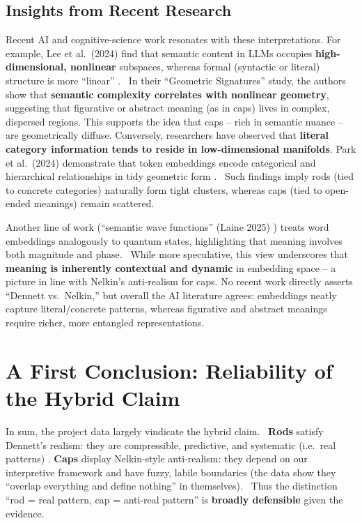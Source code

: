 \documentclass[12pt]{article}
\begin{document}
\subsection{Insights from Recent Research}\label{insights-from-recent-research}

Recent AI and cognitive-science work resonates with these interpretations. For example, Lee et al.~(2024) find that semantic content in LLMs occupies \textbf{high-dimensional, nonlinear} subspaces, whereas formal (syntactic or literal) structure is more ``linear'' .~ In their ``Geometric Signatures'' study, the authors show that \textbf{semantic complexity correlates with nonlinear geometry}, suggesting that figurative or abstract meaning (as in caps) lives in complex, dispersed regions. This supports the idea that caps -- rich in semantic nuance -- are geometrically diffuse. Conversely, researchers have observed that \textbf{literal category information tends to reside in low-dimensional manifolds}. Park et al.~(2024) demonstrate that token embeddings encode categorical and hierarchical relationships in tidy geometric form .~ Such findings imply rods (tied to concrete categories) naturally form tight clusters, whereas caps (tied to open-ended meanings) remain scattered.

Another line of work (``semantic wave functions'' (Laine 2025) ) treats word embeddings analogously to quantum states, highlighting that meaning involves both magnitude and phase.~ While more speculative, this view underscores that \textbf{meaning is inherently contextual and dynamic} in embedding space -- a picture in line with Nelkin's anti-realism for caps. No recent work directly asserts ``Dennett vs.~Nelkin,'' but overall the AI literature agrees: embeddings neatly capture literal/concrete patterns, whereas figurative and abstract meanings require richer, more entangled representations.

\section{A First Conclusion: Reliability of the Hybrid Claim}\label{a-first-conclusion-reliability-of-the-hybrid-claim}

In sum, the project data largely vindicate the hybrid claim.~ \textbf{Rods} satisfy Dennett's realism: they are compressible, predictive, and systematic (i.e.~real patterns) . \textbf{Caps} display Nelkin-style anti-realism: they depend on our interpretive framework and have fuzzy, labile boundaries (the data show they ``overlap everything and define nothing'' in themselves).~ Thus the distinction ``rod = real pattern, cap = anti-real pattern'' is \textbf{broadly defensible} given the evidence.
\end{document}

